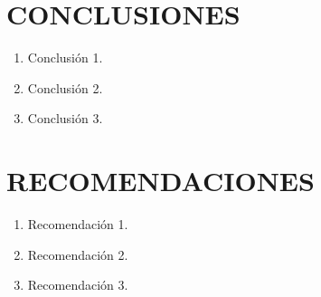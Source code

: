 

\chapter{CONCLUSIONES}
\begin{enumerate}
	\item Conclusión 1.
	\item Conclusión 2.
	\item Conclusión 3.
\end{enumerate}

\chapter{RECOMENDACIONES}
\begin{enumerate}
	\item Recomendación 1.
	\item Recomendación 2.
	\item Recomendación 3.
\end{enumerate}
